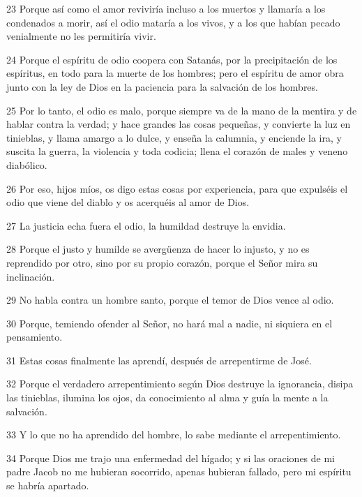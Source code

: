 \par 23 Porque así como el amor reviviría incluso a los muertos y llamaría a los condenados a morir, así el odio mataría a los vivos, y a los que habían pecado venialmente no les permitiría vivir.

\par 24 Porque el espíritu de odio coopera con Satanás, por la precipitación de los espíritus, en todo para la muerte de los hombres; pero el espíritu de amor obra junto con la ley de Dios en la paciencia para la salvación de los hombres.

\par 25 Por lo tanto, el odio es malo, porque siempre va de la mano de la mentira y de hablar contra la verdad; y hace grandes las cosas pequeñas, y convierte la luz en tinieblas, y llama amargo a lo dulce, y enseña la calumnia, y enciende la ira, y suscita la guerra, la violencia y toda codicia; llena el corazón de males y veneno diabólico.

\par 26 Por eso, hijos míos, os digo estas cosas por experiencia, para que expulséis el odio que viene del diablo y os acerquéis al amor de Dios.

\par 27 La justicia echa fuera el odio, la humildad destruye la envidia.

\par 28 Porque el justo y humilde se avergüenza de hacer lo injusto, y no es reprendido por otro, sino por su propio corazón, porque el Señor mira su inclinación.

\par 29 No habla contra un hombre santo, porque el temor de Dios vence al odio.

\par 30 Porque, temiendo ofender al Señor, no hará mal a nadie, ni siquiera en el pensamiento.

\par 31 Estas cosas finalmente las aprendí, después de arrepentirme de José.

\par 32 Porque el verdadero arrepentimiento según Dios destruye la ignorancia, disipa las tinieblas, ilumina los ojos, da conocimiento al alma y guía la mente a la salvación.

\par 33 Y lo que no ha aprendido del hombre, lo sabe mediante el arrepentimiento.

\par 34 Porque Dios me trajo una enfermedad del hígado; y si las oraciones de mi padre Jacob no me hubieran socorrido, apenas hubieran fallado, pero mi espíritu se habría apartado.

